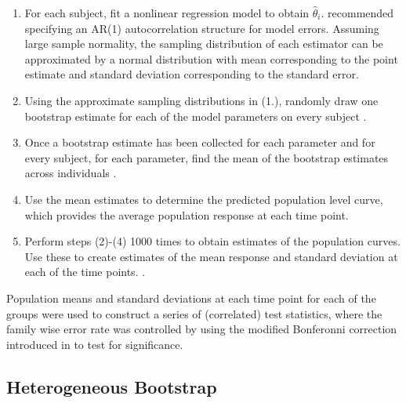 \begin{enumerate}
\vspace{-3mm}
\item For each subject, fit a nonlinear regression model to obtain $\hat{\theta}_i$. \cite{oleson2017detecting} recommended specifying an AR(1) autocorrelation structure for model errors. Assuming large sample normality, the sampling distribution of each estimator can be approximated by a normal distribution with mean corresponding to the point estimate and standard deviation corresponding to the standard error.

\item Using the approximate sampling distributions in (1.), randomly draw one bootstrap estimate for each of the model parameters on every subject .

\item Once a bootstrap estimate has been collected for each parameter and for every subject, for each parameter, find the mean of the bootstrap estimates across individuals  .

\item Use the mean estimates to determine the predicted population level curve, which provides the average population response at each time point.   

\item Perform steps (2)-(4) 1000 times to obtain estimates of the population curves. Use these to create estimates of the mean response and standard deviation at each of the time points.  .
\end{enumerate}

Population means and standard deviations at each time point for each of the groups were used to construct a series of (correlated) test statistics, where the family wise error rate was controlled by using the modified Bonferonni correction introduced in \cite{oleson2017detecting} to test for significance. 

\subsection{Heterogeneous Bootstrap}

